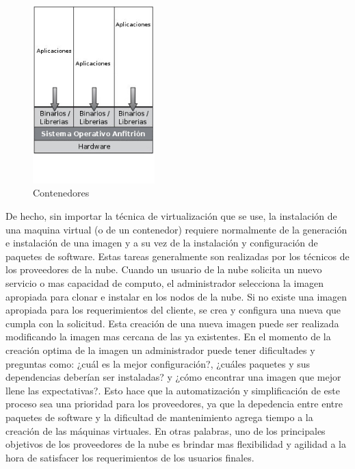 \begin{figure}[h]
    \centering
	\caption{Contenedores}
	\label{fig:contenedores}
	\includegraphics[width = 0.42\textwidth]{../architecture/v1/diagrams/contenedores}
\end{figure}

\newpage
De hecho, sin importar la técnica de virtualización que se use, la instalación de una maquina virtual (o de un contenedor) requiere normalmente de la generación e instalación de una imagen y a su vez de la instalación y configuración de paquetes de software. Estas tareas generalmente son realizadas por los técnicos de los proveedores de la nube. Cuando un usuario de la nube solicita un nuevo servicio o mas capacidad de computo, el administrador selecciona la imagen apropiada para clonar e instalar en los nodos de la nube. Si no existe una imagen apropiada para los requerimientos del cliente, se crea y configura una nueva que cumpla con la solicitud. Esta creación de una nueva imagen puede ser realizada modificando la imagen mas cercana de las ya existentes. En el momento de la creación optima de la imagen un administrador puede tener dificultades y preguntas como: ¿cuál es la mejor configuración?, ¿cuáles paquetes y sus dependencias deberían ser instaladas? y ¿cómo encontrar una imagen que mejor llene las expectativas?. Esto hace que la automatización y simplificación de este proceso sea una prioridad para los proveedores, ya que la depedencia entre entre paquetes de software y la dificultad de mantenimiento agrega tiempo a la creación de las máquinas virtuales. En otras palabras, uno de los principales objetivos de los proveedores de la nube es brindar mas flexibilidad y agilidad a la hora de satisfacer los requerimientos de los usuarios finales.\\
\\
